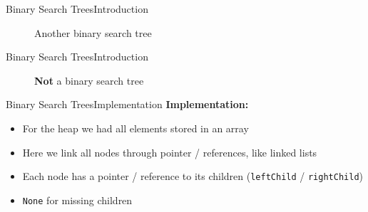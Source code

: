 
\begin{frame}{Binary Search Trees}{Introduction}
  \begin{figure}
    
    \caption{Another binary search tree}
    \label{fig:binary_search_trees:binary_tree_example2}
  \end{figure}
\end{frame}


\begin{frame}{Binary Search Trees}{Introduction}
  \begin{figure}
    
    \caption{\textbf{Not} a binary search tree}
    \label{fig:binary_search_trees:binary_tree_example3}
  \end{figure}
\end{frame}


\begin{frame}{Binary Search Trees}{Implementation}
  \textbf{Implementation:}
  \begin{itemize}
    \item<2->
      For the heap we had all elements stored in an array
    \item<2->
      Here we link all nodes through pointer / references, like linked lists
    \item<3->
      Each node has a pointer / reference to its children
      (\texttt{\color{Mittel-Blau}leftChild} /
      \texttt{\color{Mittel-Blau}rightChild})
    \item<4->
      \texttt{\color{Mittel-Blau}None} for missing children
  \end{itemize}
  \vspace{-1.0em}
  \begin{figure}
    
    \label{fig:binary_search_trees:binary_tree_impl1}
  \end{figure}
\end{frame}


